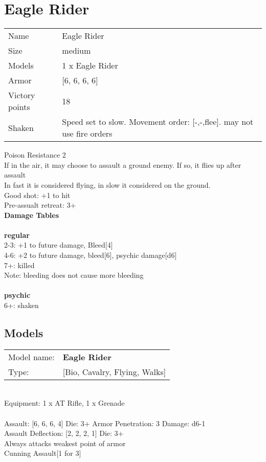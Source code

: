 \clearpage

\section{ Eagle Rider }

\begin{tabular}{ll}
  Name & Eagle Rider \\
  Size & medium\\
  Models & 1 x Eagle Rider\\
  Armor & [6, 6, 6, 6]\\
  Victory points & 18\\
  Shaken & Speed set to slow. Movement order: [-,-,flee]. may not use fire orders\\
\end{tabular}

Poison Resistance 2\\ 
If in the air, it may choose to assault a ground enemy. If so, it flies up after assault\\ 
In fast it is considered flying, in slow it considered on the ground.\\ 
Good shot: +1 to hit\\ 
Pre-assualt retreat: 3+\\ 



{\bf Damage Tables} \\
\ \\ {\bf regular } \\
2-3: +1 to future damage, Bleed[4] \\
4-6: +2 to future damage, bleed[6], psychic damage[d6] \\
7+: killed \\
Note: bleeding does not cause more bleeding \\
\ \\ {\bf psychic } \\
6+: shaken \\


\pagebreak

\subsection{ Models }

\begin{tabular}{ll}
Model name: & {\bf Eagle Rider } \\
Type: & [Bio, Cavalry, Flying, Walks] \\
\end{tabular}
\ \\
Equipment: 1 x AT Rifle, 1 x Grenade \\
\ \\
Assault: [6, 6, 6, 4] Die: 3+ Armor Penetration: 3 Damage: d6-1 \\
Assault Deflection: [2, 2, 2, 1] Die: 3+\\
\indent Always attacks weakest point of armor\\ 
Cunning Assault[1 for 3]\\ 
 
